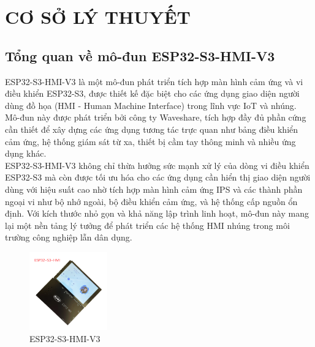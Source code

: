 \chapter{CƠ SỞ LÝ THUYẾT}
\section{Tổng quan về mô-đun ESP32-S3-HMI-V3} 
\tab ESP32-S3-HMI-V3 là một mô-đun phát triển tích hợp màn hình cảm ứng và vi điều khiển ESP32-S3, được thiết kế đặc biệt cho các ứng dụng giao diện người dùng đồ họa (HMI - Human Machine Interface) trong lĩnh vực IoT và nhúng. Mô-đun này được phát triển bởi công ty Waveshare, tích hợp đầy đủ phần cứng cần thiết để xây dựng các ứng dụng tương tác trực quan như bảng điều khiển cảm ứng, hệ thống giám sát từ xa, thiết bị cầm tay thông minh và nhiều ứng dụng khác.\\
\tab ESP32-S3-HMI-V3 không chỉ thừa hưởng sức mạnh xử lý của dòng vi điều khiển ESP32-S3 mà còn được tối ưu hóa cho các ứng dụng cần hiển thị giao diện người dùng với hiệu suất cao nhờ tích hợp màn hình cảm ứng IPS và các thành phần ngoại vi như bộ nhớ ngoài, bộ điều khiển cảm ứng, và hệ thống cấp nguồn ổn định. Với kích thước nhỏ gọn và khả năng lập trình linh hoạt, mô-đun này mang lại một nền tảng lý tưởng để phát triển các hệ thống HMI nhúng trong môi trường công nghiệp lẫn dân dụng.
\begin{figure}[H]
  \centering
  \includegraphics[width=0.3\textwidth]{Images/ESP32-S3-HMI-V3.png} 
  \caption{ESP32-S3-HMI-V3}
\end{figure}
